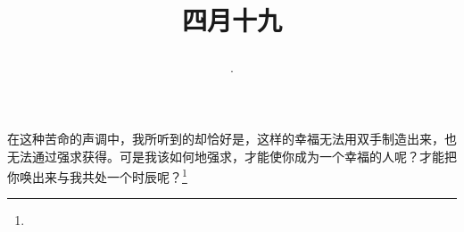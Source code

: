 \title{\date[d=26,m=5,y=2024][year:cn-y,年,month:cn,day:cn,日,·,weekday]·四月十九 }
在这种苦命的声调中，我所听到的却恰好是，这样的幸福无法用双手制造出来，也无法通过强求获得。可是我该如何地强求，才能使你成为一个幸福的人呢？才能把你唤出来与我共处一个时辰呢？\footnote{ }

